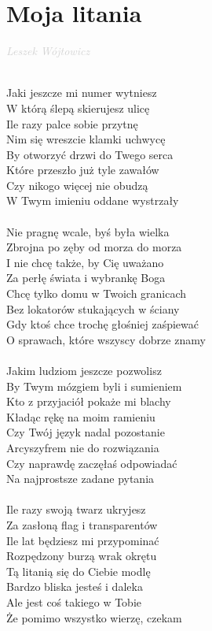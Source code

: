 \documentclass[a5paper, 10pt]{book}
\begin{document}
\section{Moja litania}\textcolor{lightgray}{\textit{Leszek Wójtowicz}}\\~\\
\begin{minipage}[t]{0.8\textwidth}
Jaki jeszcze mi numer wytniesz\\
W którą ślepą skierujesz ulicę\\
Ile razy palce sobie przytnę\\
Nim się wreszcie klamki uchwycę\\
By otworzyć drzwi do Twego serca\\
Które przeszło już tyle zawałów\\
Czy nikogo więcej nie obudzą\\
W Twym imieniu oddane wystrzały\\
\\
\hspace*{5mm}Nie pragnę wcale, byś była wielka\\
\hspace*{5mm}Zbrojna po zęby od morza do morza\\
\hspace*{5mm}I nie chcę także, by Cię uważano\\
\hspace*{5mm}Za perłę świata i wybrankę Boga\\
\hspace*{5mm}Chcę tylko domu w Twoich granicach\\
\hspace*{5mm}Bez lokatorów stukających w ściany\\
\hspace*{5mm}Gdy ktoś chce trochę głośniej zaśpiewać\\
\hspace*{5mm}O sprawach, które wszyscy dobrze znamy\\
\\
Jakim ludziom jeszcze pozwolisz\\
By Twym mózgiem byli i sumieniem\\
Kto z przyjaciół pokaże mi blachy\\
Kładąc rękę na moim ramieniu\\
Czy Twój język nadal pozostanie\\
Arcyszyfrem nie do rozwiązania\\
Czy naprawdę zaczęłaś odpowiadać\\
Na najprostsze zadane pytania\\
\\
Ile razy swoją twarz ukryjesz\\
Za zasłoną flag i transparentów\\
Ile lat będziesz mi przypominać\\
Rozpędzony burzą wrak okrętu\\
Tą litanią się do Ciebie modlę\\
Bardzo bliska jesteś i daleka\\
Ale jest coś takiego w Tobie\\
Że pomimo wszystko wierzę, czekam\\
\end{minipage}
\end{document}
